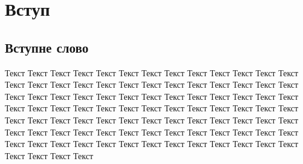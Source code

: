 


\chapter*{Вступ}


\section*{Вступне слово}
Текст Текст Текст Текст Текст Текст Текст Текст Текст Текст Текст Текст Текст Текст Текст Текст Текст Текст Текст Текст Текст Текст Текст Текст Текст Текст Текст Текст Текст Текст Текст Текст Текст Текст Текст Текст Текст Текст Текст Текст Текст Текст Текст Текст Текст Текст Текст Текст Текст Текст Текст Текст Текст Текст Текст Текст Текст Текст Текст Текст Текст Текст Текст Текст Текст Текст Текст Текст Текст Текст Текст Текст Текст Текст Текст Текст Текст Текст Текст Текст Текст Текст Текст Текст Текст Текст Текст Текст Текст Текст Текст Текст Текст Текст Текст 
